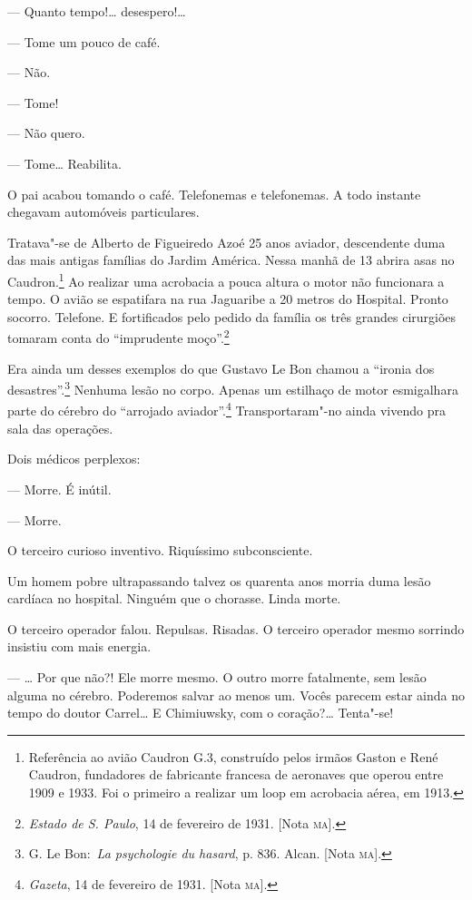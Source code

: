 --- Quanto tempo!\ldots{} desespero!\ldots{}

--- Tome um pouco de café.

--- Não.

--- Tome!

--- Não quero.

--- Tome\ldots{} Reabilita.

O pai acabou tomando o café. Telefonemas e telefonemas. A todo instante
chegavam automóveis particulares.

Tratava"-se de Alberto de Figueiredo Azoé 25 anos aviador, descendente
duma das mais antigas famílias do Jardim América. Nessa manhã de 13
abrira asas no Caudron.\footnote{Referência ao avião Caudron G.3,
  construído pelos irmãos Gaston e René Caudron, fundadores de
  fabricante francesa de aeronaves que operou entre 1909 e 1933. Foi o
  primeiro a realizar um loop em acrobacia aérea, em 1913.} Ao realizar
uma acrobacia a pouca altura o motor não funcionara a tempo. O avião se
espatifara na rua Jaguaribe a 20 metros do Hospital. Pronto socorro.
Telefone. E fortificados pelo pedido da família os três grandes
cirurgiões tomaram conta do ``imprudente moço''.\footnote{\emph{Estado de
  S. Paulo}, 14 de fevereiro de 1931. {[}Nota \textsc{ma}{]}.}

Era ainda um desses exemplos do que Gustavo Le Bon chamou a ``ironia dos
desastres''.\footnote{G. Le Bon:~\emph{La psychologie du hasard}, p. 836.
  Alcan. {[}Nota \textsc{ma}{]}.} Nenhuma lesão no corpo. Apenas um estilhaço de
motor esmigalhara parte do cérebro do ``arrojado aviador''.\footnote{\emph{Gazeta},
  14 de fevereiro de 1931. {[}Nota \textsc{ma}{]}.} Transportaram"-no ainda
vivendo pra sala das operações.

Dois médicos perplexos:

--- Morre. É inútil.

--- Morre.

O terceiro curioso inventivo. Riquíssimo subconsciente.

Um homem pobre ultrapassando talvez os quarenta anos morria duma lesão
cardíaca no hospital. Ninguém que o chorasse. Linda morte.

O terceiro operador falou. Repulsas. Risadas. O terceiro operador mesmo
sorrindo insistiu com mais energia.

--- \ldots{} Por que não?! Ele morre mesmo. O outro morre fatalmente, sem
lesão alguma no cérebro. Poderemos salvar ao menos um. Vocês parecem
estar ainda no tempo do doutor Carrel\ldots{} E Chimiuwsky, com o coração?\ldots{}
Tenta"-se!

